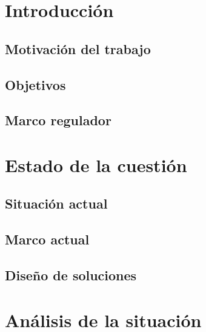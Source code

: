 \documentclass[12pt]{report} %
\begin{document}
\chapter{Introducción}

\section{Motivación del trabajo}
\lipsum[1-3]

\section{Objetivos}
\lipsum[1-2]

\section{Marco regulador}
\lipsum[5-6]


\chapter{Estado de la cuestión}

\section{Situación actual}
\lipsum[10-13]

\section{Marco actual}
\lipsum[8-9]

\section{Diseño de soluciones}
\lipsum[4-5]


\chapter{Análisis de la situación}
\end{document}
